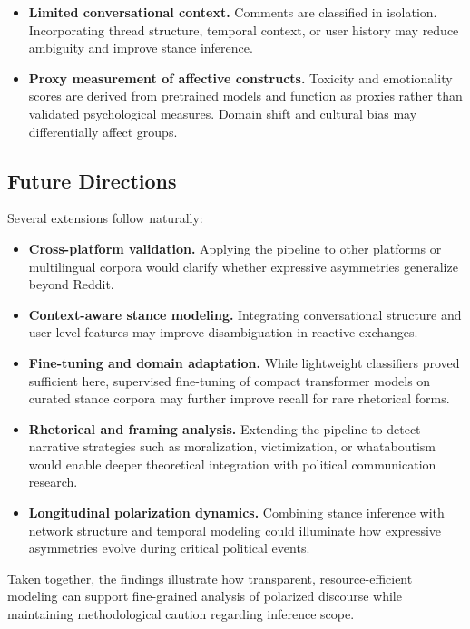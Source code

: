 \documentclass[letterpaper]{article} %
\begin{document}
\begin{itemize}
\item \textbf{Limited conversational context.} Comments are classified in isolation. Incorporating thread structure, temporal context, or user history may reduce ambiguity and improve stance inference.

\item \textbf{Proxy measurement of affective constructs.} Toxicity and emotionality scores are derived from pretrained models and function as proxies rather than validated psychological measures. Domain shift and cultural bias may differentially affect groups.
\end{itemize}

\subsection{Future Directions}

Several extensions follow naturally:

\begin{itemize}
\item \textbf{Cross-platform validation.} Applying the pipeline to other platforms or multilingual corpora would clarify whether expressive asymmetries generalize beyond Reddit.

\item \textbf{Context-aware stance modeling.} Integrating conversational structure and user-level features may improve disambiguation in reactive exchanges.

\item \textbf{Fine-tuning and domain adaptation.} While lightweight classifiers proved sufficient here, supervised fine-tuning of compact transformer models on curated stance corpora may further improve recall for rare rhetorical forms.

\item \textbf{Rhetorical and framing analysis.} Extending the pipeline to detect narrative strategies such as moralization, victimization, or whataboutism would enable deeper theoretical integration with political communication research.

\item \textbf{Longitudinal polarization dynamics.} Combining stance inference with network structure and temporal modeling could illuminate how expressive asymmetries evolve during critical political events.
\end{itemize}

Taken together, the findings illustrate how transparent, resource-efficient modeling can support fine-grained analysis of polarized discourse while maintaining methodological caution regarding inference scope.
\end{document}
